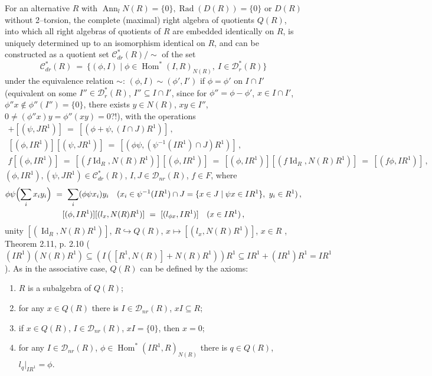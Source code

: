 \documentclass[a4paper,11pt]{article}
\DeclareMathOperator{\prr}{Rad}
\DeclareMathOperator{\Id}{Id}
\DeclareMathOperator{\Hom}{Hom}
\DeclareMathOperator{\Ann}{Ann}
\begin{document}
For an alternative $R$ with ${\Ann_l N(R)=\{0\}, \prr(D(R))=\{0\}}$ or 
$D(R)$ without 2--torsion, the complete (maximal) right algebra of quotients 
$Q(R)$, into which all right algebras of quotients of $R$ are embedded 
identically on $R$, is uniquely determined up to an isomorphism identical 
on $R$, and can be constructed as a quotient set $\mathcal{C}_{dr}^*(R)/\sim$ 
of the set 
\[
\mathcal{C}_{dr}^*(R)\ =\ \{(\phi, I)\mid 
\phi\in \Hom^*(I, R)_{N(R)},\ I\in \mathcal{D}_r^*(R)\}
\] 
under the equivalence relation $\sim$: ${(\phi, I)\sim (\phi', I')}$ if 
${\phi=\phi'}$ on ${I\cap I'}$ (equivalent on some 
${I''\in \mathcal{D}_r^*(R)}$, ${I''\subseteq I\cap I'}$, since for 
${\phi''=\phi-\phi'}$, ${x\in I\cap I'}$, ${\phi'' x\notin \phi''(I'')=\{0\}}$, 
there exists ${y\in N(R)}$, ${x y\in I''}$, 
${0\ne (\phi'' x) y=\phi'' (x y)=0}$?!), with the operations 
\begin{gather*}  
[(\phi, I R^1)]+[(\psi, J R^1)]\ =\ [(\phi+\psi, (I\cap J) R^1)]\,,
\\ 
[(\phi, I R^1)] [(\psi, J R^1)]\ =\ 
[(\phi \psi, (\psi^{-1}(I R^1)\cap J) R^1)]\,,
\\
f [(\phi, I R^1)]\ =\ [(f \Id_R, N(R) R^1)] [(\phi, I R^1)]\ =\ 
[(\phi, I R^1)] [(f \Id_R, N(R) R^1)]\ =\ [(f \phi, I R^1)]\,,
\end{gather*}
${(\phi, I R^1), (\psi, J R^1)\in \mathcal{C}_{dr}^*(R)}$, 
${I, J\in \mathcal{D}_{nr}(R)}$, ${f\in F}$, where  
\begin{gather*}
\phi \psi\Bigl(\sum_i x_i y_i\Bigr)\ =\ 
\sum_i (\phi \psi x_i) y_i\quad 
(x_i\in \psi^{-1}(I R^1)\cap J=\{x\in J\mid \psi x\in I R^1\},\ y_i\in R^1)\,,
\\
[(\phi, I R^1)] [(l_x, N(R) R^1)]\ =\ [(l_{\phi x}, I R^1)]\quad (x\in I R^1)\,,
\end{gather*}
unity ${[(\Id_R, N(R) R^1)]}$, ${R\hookrightarrow Q(R)}$, 
${x\longmapsto [(l_x, N(R) R^1)]}$, ${x\in R}$ \cite{MLQA},  
Theorem 2.11, p. 2.10 (${(I R^1) (N(R) R^1)\subseteq (I ([R^1, N(R)]+N(R) R^1)) R^1
\subseteq I R^1+(I R^1) R^1=I R^1}$). As in the associative case, $Q(R)$ can be 
defined by the axioms: 
\begin{enumerate}

\item $R$ is a subalgebra of $Q(R)$; 
                   
\item for any ${x\in Q(R)}$ there is ${I\in \mathcal{D}_{nr}(R)}$, 
${x I\subseteq R}$; 

\item if ${x\in Q(R)}$, ${I\in \mathcal{D}_{nr}(R)}$, ${x I=\{0\}}$, 
then ${x=0}$; 

\item for any ${I\in \mathcal{D}_{nr}(R)}$, ${\phi\in \Hom^*(I R^1, R)_{N(R)}}$ 
there is ${q\in Q(R)}$, ${l_q|_{I R^1}=\phi}$.

\end{enumerate}
\end{document}
